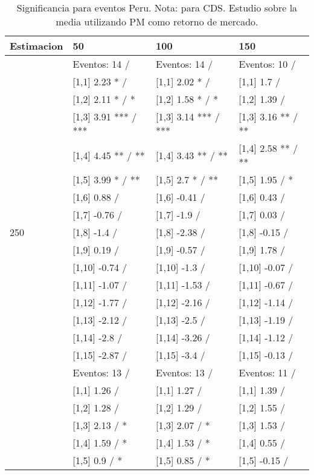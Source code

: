 \begin{table}

\caption{Significancia para eventos Peru. Nota: para CDS. Estudio sobre la media utilizando PM como retorno de mercado.}
\centering
\begin{tabular}[t]{llll}
\toprule
Estimacion & 50 & 100 & 150\\
\midrule
 & Eventos:  14 / & Eventos:  14 / & Eventos:  10 /\\
 & {}[1,1] 2.23 * / & {}[1,1] 2.02 * / & {}[1,1] 1.7  /\\
 & {}[1,2] 2.11 * / * & {}[1,2] 1.58 * / * & {}[1,2] 1.39  /\\
 & {}[1,3] 3.91 *** / *** & {}[1,3] 3.14 *** / *** & {}[1,3] 3.16 ** / **\\
 & {}[1,4] 4.45 ** / ** & {}[1,4] 3.43 ** / ** & {}[1,4] 2.58 ** / **\\
\addlinespace
 & {}[1,5] 3.99 * / ** & {}[1,5] 2.7 * / ** & {}[1,5] 1.95  / *\\
 & {}[1,6] 0.88  / & {}[1,6] -0.41  / & {}[1,6] 0.43  /\\
 & {}[1,7] -0.76  / & {}[1,7] -1.9  / & {}[1,7] 0.03  /\\
250 & {}[1,8] -1.4  / & {}[1,8] -2.38  / & {}[1,8] -0.15  /\\
 & {}[1,9] 0.19  / & {}[1,9] -0.57  / & {}[1,9] 1.78  /\\
\addlinespace
 & {}[1,10] -0.74  / & {}[1,10] -1.3  / & {}[1,10] -0.07  /\\
 & {}[1,11] -1.07  / & {}[1,11] -1.53  / & {}[1,11] -0.67  /\\
 & {}[1,12] -1.77  / & {}[1,12] -2.16  / & {}[1,12] -1.14  /\\
 & {}[1,13] -2.12  / & {}[1,13] -2.5  / & {}[1,13] -1.19  /\\
 & {}[1,14] -2.8  / & {}[1,14] -3.26  / & {}[1,14] -1.12  /\\
\addlinespace
 & {}[1,15] -2.87  / & {}[1,15] -3.4  / & {}[1,15] -0.13  /\\
 & Eventos:  13 / & Eventos:  13 / & Eventos:  11 /\\
 & {}[1,1] 1.26  / & {}[1,1] 1.27  / & {}[1,1] 1.39  /\\
 & {}[1,2] 1.28  / & {}[1,2] 1.29  / & {}[1,2] 1.55  /\\
 & {}[1,3] 2.13  / * & {}[1,3] 2.07  / * & {}[1,3] 1.53  /\\
\addlinespace
 & {}[1,4] 1.59  / * & {}[1,4] 1.53  / * & {}[1,4] 0.55  /\\
 & {}[1,5] 0.9  / * & {}[1,5] 0.85  / * & {}[1,5] -0.15  /\\

\end{tabular}
\end{table}
